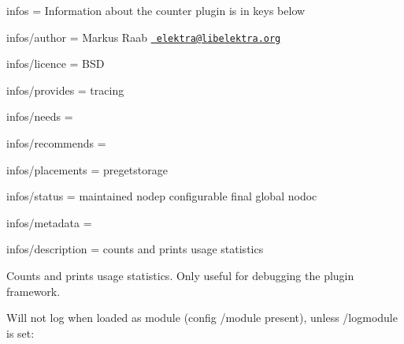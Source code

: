 
\begin{DoxyItemize}
\item infos = Information about the counter plugin is in keys below
\item infos/author = Markus Raab \href{mailto:elektra@libelektra.org}{\texttt{ elektra@libelektra.\+org}}
\item infos/licence = B\+SD
\item infos/provides = tracing
\item infos/needs =
\item infos/recommends =
\item infos/placements = pregetstorage
\item infos/status = maintained nodep configurable final global nodoc
\item infos/metadata =
\item infos/description = counts and prints usage statistics
\end{DoxyItemize}

Counts and prints usage statistics. Only useful for debugging the plugin framework.

Will not log when loaded as module (config {\ttfamily /module} present), unless {\ttfamily /logmodule} is set\+:


\begin{DoxyCode}{0}
\end{DoxyCode}
 